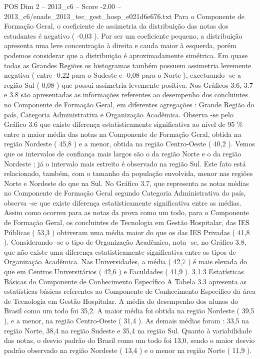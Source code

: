 \begin{textsample}{POS Dim 2 – 2013\_c6 – Score -2.00 – 2013\_c6/enade\_2013\_tec\_gest\_hosp\_e021d6e676.txt}
Para o Componente de Formação Geral, o coeficiente de assimetria da distribuição das notas dos estudantes é negativo ( -0,03 ).
Por ser um coeficiente pequeno, a distribuição apresenta uma leve concentração à direita e cauda maior à esquerda, porém podemos considerar que a distribuição é aproximadamente simétrica.
Em quase todas as Grandes Regiões os histogramas também possuem assimetria levemente negativa ( entre -0,22 para o Sudeste e -0,08 para o Norte ), excetuando -se a região Sul ( 0,08 ) que possui assimetria levemente positiva.
Nos Gráficos 3.6, 3.7 e 3.8 são apresentadas as informações referentes ao desempenho dos concluintes no Componente de Formação Geral, em diferentes agregações : Grande Região do país, Categoria Administrativa e Organização Acadêmica.
Observa -se pelo Gráfico 3.6 que existe diferença estatisticamente significativa ao nível de 95 \% entre a maior média das notas na Componente de Formação Geral, obtida na região Nordeste ( 45,8 ) e a menor, obtida na região Centro-Oeste ( 40,2 ).
Vemos que os intervalos de confiança mais largos são o da região Norte e o da região Nordeste ; já o intervalo mais estreito é observado na região Sul.
Este fato está relacionado, também, com o tamanho da população envolvida, menor nas regiões Norte e Nordeste do que na Sul.
No Gráfico 3.7, que representa as notas médias no Componente de Formação Geral segundo Categoria Administrativa do país, observa -se que existe diferença estatisticamente significativa entre as médias.
Assim como ocorreu para as notas da prova como um todo, para o Componente de Formação Geral, os concluintes de Tecnologia em Gestão Hospitalar, das IES Públicas ( 53,3 ) obtiveram uma média maior do que os das IES Privadas ( 41,8 ).
Considerando -se o tipo de Organização Acadêmica, nota -se, no Gráfico 3.8, que não existe uma diferença estatisticamente significativa entre os tipos de Organização Acadêmica.
Nas Universidades, a média ( 42,7 ) é mais elevada do que em Centros Universitários ( 42,6 ) e Faculdades ( 41,9 ). 3.1.3 Estatísticas Básicas do Componente de Conhecimento Específico A Tabela 3.3 apresenta as estatísticas básicas referentes ao Componente de Conhecimento Específico da área de Tecnologia em Gestão Hospitalar.
A média do desempenho dos alunos do Brasil como um todo foi 35,2.
A maior média foi obtida na região Nordeste ( 39,5 ), e a menor, na região Centro-Oeste ( 31,4 ).
As demais médias foram : 33,5 na região Norte, 38,4 na região Sudeste e 35,4 na região Sul.
Quanto à variabilidade das notas, o desvio padrão do Brasil como um todo foi 13,0, sendo o maior desvio padrão observado na região Nordeste ( 13,4 ) e o menor na região Norte ( 11,9 ).

\end{textsample}
